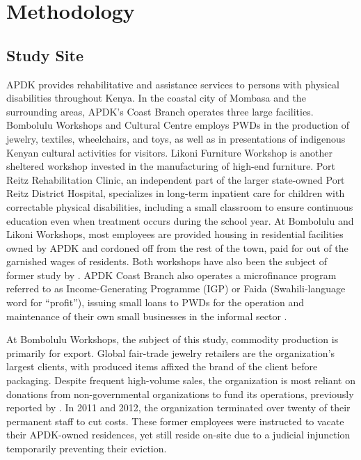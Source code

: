 \documentclass{../../../coursework}
\begin{document}
\section{Methodology}

\subsection{Study Site}

APDK provides rehabilitative and assistance services to persons with physical
disabilities throughout Kenya. In the coastal city of Mombasa and the
surrounding areas, APDK's Coast Branch operates three large facilities.
Bombolulu Workshops and Cultural Centre employs PWDs in the production of
jewelry, textiles, wheelchairs, and toys, as well as in presentations of
indigenous Kenyan cultural activities for visitors. Likoni Furniture Workshop
is another sheltered workshop invested in the manufacturing of high-end
furniture. Port Reitz Rehabilitation Clinic, an independent part of the larger
state-owned Port Reitz District Hospital, specializes in long-term inpatient
care for children with correctable physical disabilities, including a small
classroom to ensure continuous education even when treatment occurs during the
school year. At Bombolulu and Likoni Workshops, most employees are provided
housing in residential facilities owned by APDK and cordoned off from the rest
of the town, paid for out of the garnished wages of residents. Both workshops
have also been the subject of former study by \textcite{Cobley2012}. APDK
Coast Branch also operates a microfinance program referred to as
Income-Generating Programme (IGP) or Faida (Swahili-language word for
``profit''), issuing small loans to PWDs for the operation and maintenance of
their own small businesses in the informal sector \parencites[for further
discussion of the Faida program, see][]{Wameyo2015}[also][]{Cobley2012}.

At Bombolulu Workshops, the subject of this study, commodity production is
primarily for export. Global fair-trade jewelry retailers are the
organization's largest clients, with produced items affixed the brand of the
client before packaging. Despite frequent high-volume sales, the organization
is most reliant on donations from non-governmental organizations to fund its
operations, previously reported by \textcite{Cobley2012}. In 2011 and 2012,
the organization terminated over twenty of their permanent staff to cut costs.
These former employees were instructed to vacate their APDK-owned residences,
yet still reside on-site due to a judicial injunction temporarily preventing
their eviction. 
\end{document}
